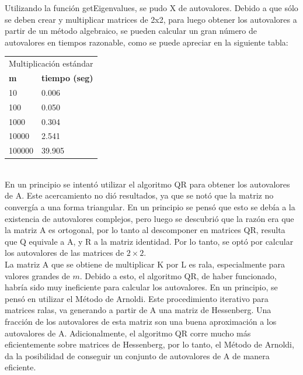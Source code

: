 \documentclass[a4paper,11pt]{article}
\begin{document}
Utilizando la función getEigenvalues, se pudo X de autovalores. Debido a que
sólo se deben crear y multiplicar matrices de 2x2, para luego obtener los
autovalores a partir de un método algebraico, se pueden calcular un gran número
de autovalores en tiempos razonable, como se puede apreciar en la siguiente tabla:\\
\begin{tabular}{|l||l|}
\hline
\multicolumn{2}{|l|}{Multiplicaci\'on est\'andar}\\
\cline{1-2}
\textbf{m}&\textbf{tiempo (seg)}\\
\hline\hline
10 & 0.006 \\
100 & 0.050\\
1000 & 0.304\\
10000 & 2.541\\
100000 & 39.905\\
\hline
\end{tabular}\\

En un principio se intentó utilizar el algoritmo QR para obtener los
autovalores de A. Este acercamiento no di\'o resultados, ya que se not\'o que la
matriz no converg\'ia a una forma triangular. En un principio se pens\'o que esto
se deb\'ia a la existencia de autovalores complejos, pero luego se descubri\'o que
la raz\'on era que la matriz A es ortogonal, por lo tanto al descomponer en
matrices QR, resulta que Q equivale a A, y R a la matriz identidad. Por lo tanto, se opt\'o por
calcular los autovalores de las matrices de $2 \times 2$.\\

La matriz A que se obtiene de multiplicar K por L es rala, especialmente para
valores grandes de $m$. Debido a esto, el algoritmo QR, de haber funcionado,
habr\'ia sido muy ineficiente para calcular los autovalores. En un principio, se
pens\'o en utilizar el M\'etodo de Arnoldi. Este procedimiento iterativo para
matrices ralas, va generando a partir de A una matriz de Hessenberg. Una
fracci\'on de los autovalores de esta matriz son una buena aproximaci\'on a los
autovalores de A. Adicionalmente, el algoritmo QR corre mucho m\'as
eficientemente sobre matrices de Hessenberg, por lo tanto, el M\'etodo de
Arnoldi, da la posibilidad de conseguir un conjunto de autovalores de A de
manera eficiente. \\
\newpage
\end{document}
